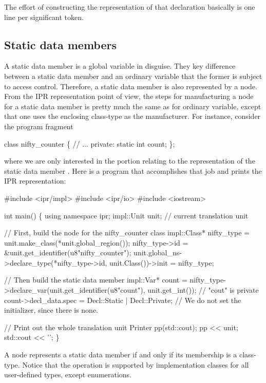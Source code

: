 \documentclass[11pt]{article}
\begin{document}
The effort of constructing the representation of that declaration basically is
one line per significant token. 


\subsection{Static data members}
\label{sec:named.data.static-member}

A static data member is a global variable in disguise.  They key difference
between a static data member and an ordinary variable that the former is
subject to access control.  Therefore, a static data member is also
represented by a  node.  From the IPR representation point of view,
the steps for manufacturing a node for a static data member is pretty much
the same as for ordinary variable, except that one uses the enclosing
class-type as the manufacturer.  For instance, consider the program fragment 
\begin{Program}
  class nifty_counter \{
    // ...
  private:
     static int count;
  \};
\end{Program}
where we are only interested in the portion relating to the representation of
the static data member .  Here is a program that
accomplishes that job and prints the IPR representation:
\begin{Program}
#include <ipr/impl>
#include <ipr/io>
#include <iostream>

int main()
\{
   using namespace ipr;
   impl::Unit unit;              // current translation unit

   // First, build the node for the nifty_counter class
   impl::Class* nifty_type = unit.make_class(*unit.global_region());
   nifty_type->id = &unit.get_identifier(u8"nifty_counter");
   unit.global_ns->declare_type(*nifty_type->id, unit.Class())->init
      = nifty_type;
   
   // Then build the static data member
   impl::Var* count = nifty_type->declare_var(unit.get_identifier(u8"count"),
                                              unit.get_int());
   // "cout" is private 
   count->decl_data.spec = Decl::Static | Decl::Private;
   // We do not set the initializer, since there is none.
   
   // Print out the whole translation unit
   Printer pp(std::cout);
   pp << unit;
   std::cout << '';
\}
\end{Program}

A  node represents a static data member if and only if its
membership is a class-type.  Notice that the operation 
is supported by implementation classes for all user-defined types, except
enumerations. 
\end{document}
